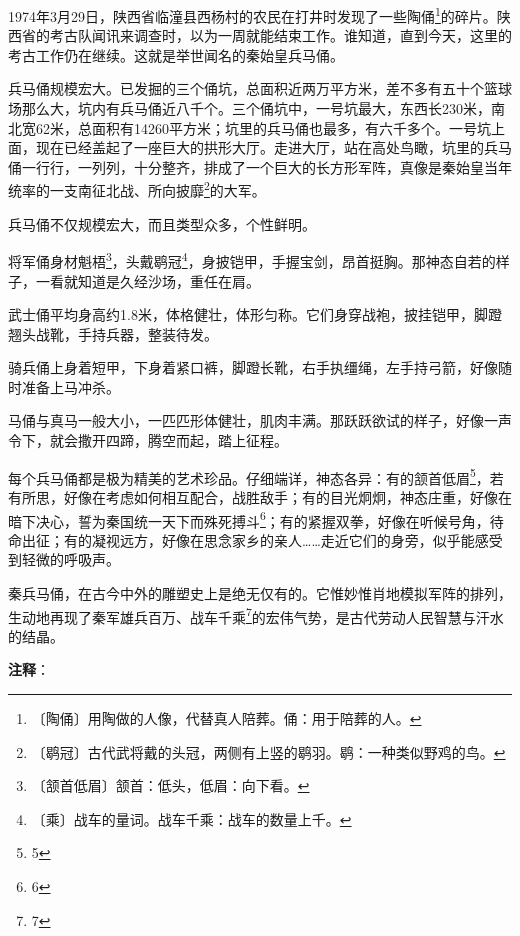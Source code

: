 \documentclass[12pt,UTF-8,openany]{ctexbook}
\begin{document}
\begin{Large}
    
    1974年3月29日，陕西省临潼县西杨村的农民在打井时发现了一些陶俑\footnote{〔陶俑〕用陶做的人像，代替真人陪葬。俑：用于陪葬的人。}的碎片。陕西省的考古队闻讯来调查时，以为一周就能结束工作。谁知道，直到今天，这里的考古工作仍在继续。这就是举世闻名的秦始皇兵马俑。
    
    兵马俑规模宏大。已发掘的三个俑坑，总面积近两万平方米，差不多有五十个篮球场那么大，坑内有兵马俑近八千个。三个俑坑中，一号坑最大，东西长230米，南北宽62米，总面积有14260平方米；坑里的兵马俑也最多，有六千多个。一号坑上面，现在已经盖起了一座巨大的拱形大厅。走进大厅，站在高处鸟瞰，坑里的兵马俑一行行，一列列，十分整齐，排成了一个巨大的长方形军阵，真像是秦始皇当年统率的一支南征北战、所向披靡\footnote{〔鹖冠〕古代武将戴的头冠，两侧有上竖的鹖羽。鹖：一种类似野鸡的鸟。}的大军。
    
    兵马俑不仅规模宏大，而且类型众多，个性鲜明。
    
    将军俑身材魁梧\footnote{〔颔首低眉〕颔首：低头，低眉：向下看。}，头戴鹖冠\footnote{〔乘〕战车的量词。战车千乘：战车的数量上千。}，身披铠甲，手握宝剑，昂首挺胸。那神态自若的样子，一看就知道是久经沙场，重任在肩。
    
    武士俑平均身高约1.8米，体格健壮，体形匀称。它们身穿战袍，披挂铠甲，脚蹬翘头战靴，手持兵器，整装待发。
    
    骑兵俑上身着短甲，下身着紧口裤，脚蹬长靴，右手执缰绳，左手持弓箭，好像随时准备上马冲杀。
    
    马俑与真马一般大小，一匹匹形体健壮，肌肉丰满。那跃跃欲试的样子，好像一声令下，就会撒开四蹄，腾空而起，踏上征程。
    
    每个兵马俑都是极为精美的艺术珍品。仔细端详，神态各异：有的颔首低眉\footnote{5}，若有所思，好像在考虑如何相互配合，战胜敌手；有的目光炯炯，神态庄重，好像在暗下决心，誓为秦国统一天下而殊死搏斗\footnote{6}；有的紧握双拳，好像在听候号角，待命出征；有的凝视远方，好像在思念家乡的亲人……走近它们的身旁，似乎能感受到轻微的呼吸声。
    
    秦兵马俑，在古今中外的雕塑史上是绝无仅有的。它惟妙惟肖地模拟军阵的排列，生动地再现了秦军雄兵百万、战车千乘\footnote{7}的宏伟气势，是古代劳动人民智慧与汗水的结晶。
    
\end{Large}


\newpage

\textbf{注释}：

\vspace{-1em}
\end{document}
